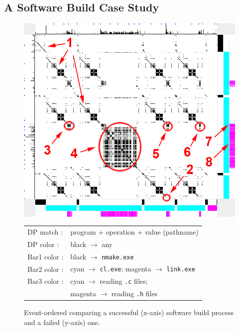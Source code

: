 \subsection{A Software Build Case Study}
\label{sec:build}

\begin{figure}[htb]
\begin{center}
\includegraphics[width=1.0\columnwidth]{lviz/make-fail.png}
\caption{Event-ordered \VDP{} comparing a successful (x-axis)
software build process and a failed (y-axis) one.
\label{fig:make-fail}
}
\begin{tabular}{ll}
DP match : & program + operation + value (pathname)\\
DP color : & black $\rightarrow$ any\\
Bar1 color : & black $\rightarrow$ {\tt nmake.exe}\\
Bar2 color : & cyan $\rightarrow$ {\tt cl.exe}; magenta $\rightarrow$ {\tt link.exe}\\
Bar3 color : & cyan $\rightarrow$ reading {\tt .c} files;\\
 & magenta $\rightarrow$ reading {\tt .h} files
\end{tabular}
\end{center}
\end{figure}

